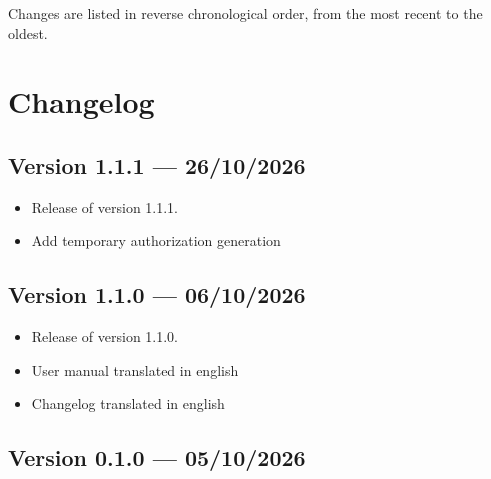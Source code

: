 ﻿\documentclass[11pt,a4paper]{article}
\newcommand{\version}[1]{\textbf{Version #1}}
\begin{document}
Changes are listed in reverse chronological order, from the most
recent to the oldest.

\section{Changelog}

\subsection*{\version{1.1.1} --- 26/10/2026}


\begin{itemize}[leftmargin=*]
    \item Release of version 1.1.1.
    \item Add temporary authorization generation
\end{itemize}

\subsection*{\version{1.1.0} --- 06/10/2026}


\begin{itemize}[leftmargin=*]
    \item Release of version 1.1.0.
    \item User manual translated in english
    \item Changelog translated in english
\end{itemize}


\subsection*{\version{0.1.0} --- 05/10/2026}

\end{document}
